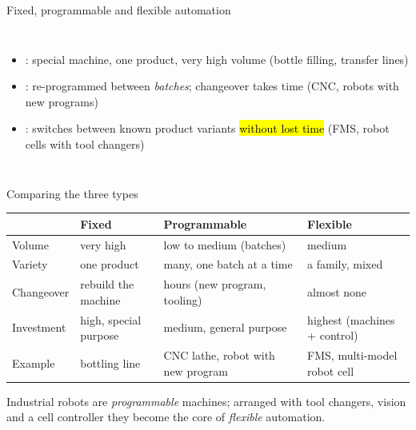 \documentclass[aspectratio=169,10pt]{beamer}
\begin{document}
\begin{frame}[t]{Fixed, programmable and flexible automation}
\begin{columns}[T,onlytextwidth]
\begin{itemize}\small
\item {}: special machine, one product, very high volume (bottle filling, transfer lines)
\item {}: re-programmed between \emph{batches}; changeover takes time (CNC, robots with new programs)
\item {}: switches between known product variants \hl{without lost time} (FMS, robot cells with tool changers)
\end{itemize}
\centering
{}
\end{columns}
\end{frame}

\begin{frame}[t]{Comparing the three types}
\centering
\small
\begin{tabularx}{.94\textwidth}{@{}l X X X@{}}
\toprule
 & \textbf{Fixed} & \textbf{Programmable} & \textbf{Flexible}\\
\midrule
Volume & very high & low to medium (batches) & medium\\
Variety & one product & many, one batch at a time & a family, mixed\\
Changeover & rebuild the machine & hours (new program, tooling) & almost none\\
Investment & high, special purpose & medium, general purpose & highest (machines + control)\\
Example & bottling line & CNC lathe, robot with new program & FMS, multi-model robot cell\\
\bottomrule
\end{tabularx}
\vspace{3mm}
\begin{notebox}
Industrial robots are \emph{programmable} machines; arranged with tool changers, vision and a cell controller they become the core of \emph{flexible} automation.
\end{notebox}
\end{frame}
\end{document}
